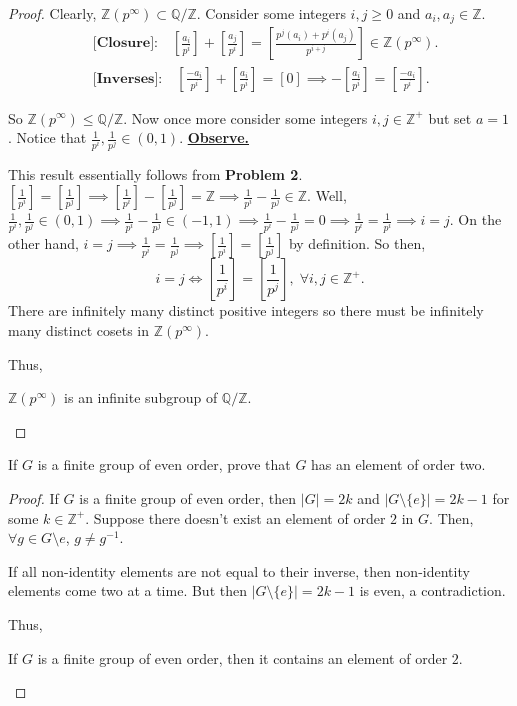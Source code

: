 \documentclass[addpoints,10pt]{exam}
\theoremstyle{plain}
\theoremstyle{definition}
\newtheorem{prob}[thm]{Problem}
\theoremstyle{plain}
\theoremstyle{plain}
\theoremstyle{definition}
\let\oldprob\prob
\let\endoldprob\endprob
\renewenvironment{prob}
  {\begin{singlespace}\oldprob}
  {\endoldprob\end{singlespace}}
\newcommand{\Observe}{\text{Observe.}}
\newcommand{\QQ}{\ensuremath{\mathbb{Q}}}
\newcommand{\ZZ}{\ensuremath{\mathbb{Z}}}
\begin{document}
\begin{proof}
    Clearly, $\ZZ(p^{\infty})\subset \QQ/\ZZ$. Consider some integers $i,j\geq 0$ and $a_{i},a_{j}\in \ZZ$. 
    \begin{align*}
      &\textbf{[Closure]:}\quad[\frac{a_{i}}{p^{i}}]+[\frac{a_{j}}{p^{i}}]=[\frac{p^{j}(a_{i})+p^{i}(a_{j})}{p^{i+j}}]\in \ZZ(p^{\infty}).\\
      &\textbf{[Inverses]:}\quad[\frac{-a_{i}}{p^{i}}]+[\frac{a_{i}}{p^{i}}]=[0]\implies -[\frac{a_{i}}{p^{i}}]=[\frac{-a_{i}}{p^{i}}].
    \end{align*}

    So $\ZZ(p^{\infty})\leq \QQ/\ZZ$. Now once more consider some integers $i,j\in \ZZ^{+}$ but set $a=1$. Notice that $\frac{1}{p^{i}},\frac{1}{p^{j}}\in (0,1)$. \underline{\textbf{Observe.}}

    This result essentially follows from \textbf{Problem 2}. $[\frac{1}{p^{i}}]=[\frac{1}{p^{j}}]\implies [\frac{1}{p^{i}}]-[\frac{1}{p^{j}}]=\ZZ\implies \frac{1}{p^{i}}-\frac{1}{p^{j}}\in \ZZ$. Well, $\frac{1}{p^{i}},\frac{1}{p^{j}}\in (0,1)\implies \frac{1}{p^{i}}-\frac{1}{p^{j}}\in (-1,1)\implies \frac{1}{p^{i}}-\frac{1}{p^{j}}=0\implies \frac{1}{p^{i}}=\frac{1}{p^{i}}\implies i=j$. On the other hand, $i=j\implies \frac{1}{p^{i}}=\frac{1}{p^{j}}\implies [\frac{1}{p^{i}}]=[\frac{1}{p^{j}}]$ by definition. So then,
    $$i=j\iff [\frac{1}{p^{i}}]=[\frac{1}{p^{j}}],\;\forall i,j\in \ZZ^{+}.$$
    There are infinitely many distinct positive integers so there must be infinitely many distinct cosets in $\ZZ(p^{\infty})$.

    Thus,
    \begin{center}
    $\ZZ(p^{\infty})$ is an infinite subgroup of $\QQ/\ZZ$.
    \end{center}
\end{proof}
\newpage

\begin{prob}
  If $G$ is a finite group of even order, prove that $G$ has an element of order two. 
\end{prob}

\begin{proof}
  If $G$ is a finite group of even order, then $|G|=2k$ and $|G\setminus\{e\}|=2k-1$ for some $k\in \ZZ^{+}.$ Suppose there doesn't exist an element of order $2$ in $G$. Then, $\forall g\in G\setminus{e}$, $g\neq g^{-1}$. \Observe

  If all non-identity elements are not equal to their inverse, then non-identity elements come two at a time. But then $|G\setminus \{e\}|=2k-1$ is even, a contradiction.

  Thus,

\begin{center}
  If $G$ is a finite group of even order, then it contains an element of order $2$.
\end{center}
\end{proof}
\end{document}
